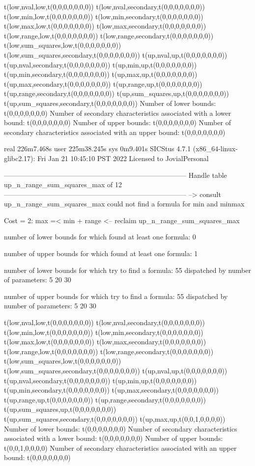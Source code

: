 t(low,nval,low,t(0,0,0,0,0,0,0))
t(low,nval,secondary,t(0,0,0,0,0,0,0))
t(low,min,low,t(0,0,0,0,0,0,0))
t(low,min,secondary,t(0,0,0,0,0,0,0))
t(low,max,low,t(0,0,0,0,0,0,0))
t(low,max,secondary,t(0,0,0,0,0,0,0))
t(low,range,low,t(0,0,0,0,0,0,0))
t(low,range,secondary,t(0,0,0,0,0,0,0))
t(low,sum_squares,low,t(0,0,0,0,0,0,0))
t(low,sum_squares,secondary,t(0,0,0,0,0,0,0))
t(up,nval,up,t(0,0,0,0,0,0,0))
t(up,nval,secondary,t(0,0,0,0,0,0,0))
t(up,min,up,t(0,0,0,0,0,0,0))
t(up,min,secondary,t(0,0,0,0,0,0,0))
t(up,max,up,t(0,0,0,0,0,0,0))
t(up,max,secondary,t(0,0,0,0,0,0,0))
t(up,range,up,t(0,0,0,0,0,0,0))
t(up,range,secondary,t(0,0,0,0,0,0,0))
t(up,sum_squares,up,t(0,0,0,0,0,0,0))
t(up,sum_squares,secondary,t(0,0,0,0,0,0,0))
Number of lower bounds:                                             t(0,0,0,0,0,0,0)
Number of secondary characteristics associated with a lower bound:  t(0,0,0,0,0,0,0)
Number of upper bounds:                                             t(0,0,0,0,0,0,0)
Number of secondary characteristics associated with an upper bound: t(0,0,0,0,0,0,0)

real	226m7.468s
user	225m38.245s
sys	0m9.401s
SICStus 4.7.1 (x86_64-linux-glibc2.17): Fri Jan 21 10:45:10 PST 2022
Licensed to JovialPersonal


--------------------------------------------------------------------------------
Handle table up_n_range_sum_squares_max of 12
--------------------------------------------------------------------------------
--> consult up_n_range_sum_squares_max
could not find a formula for min and minmax

Cost =  2:  max =< min + range
<-- reclaim up_n_range_sum_squares_max

number of lower bounds for which found at least one formula: 0

number of upper bounds for which found at least one formula: 1

number of lower bounds for which try to find a formula: 55
dispatched by number of parameters: 5  20  30

number of upper bounds for which try to find a formula: 55
dispatched by number of parameters: 5  20  30

t(low,nval,low,t(0,0,0,0,0,0,0))
t(low,nval,secondary,t(0,0,0,0,0,0,0))
t(low,min,low,t(0,0,0,0,0,0,0))
t(low,min,secondary,t(0,0,0,0,0,0,0))
t(low,max,low,t(0,0,0,0,0,0,0))
t(low,max,secondary,t(0,0,0,0,0,0,0))
t(low,range,low,t(0,0,0,0,0,0,0))
t(low,range,secondary,t(0,0,0,0,0,0,0))
t(low,sum_squares,low,t(0,0,0,0,0,0,0))
t(low,sum_squares,secondary,t(0,0,0,0,0,0,0))
t(up,nval,up,t(0,0,0,0,0,0,0))
t(up,nval,secondary,t(0,0,0,0,0,0,0))
t(up,min,up,t(0,0,0,0,0,0,0))
t(up,min,secondary,t(0,0,0,0,0,0,0))
t(up,max,secondary,t(0,0,0,0,0,0,0))
t(up,range,up,t(0,0,0,0,0,0,0))
t(up,range,secondary,t(0,0,0,0,0,0,0))
t(up,sum_squares,up,t(0,0,0,0,0,0,0))
t(up,sum_squares,secondary,t(0,0,0,0,0,0,0))
t(up,max,up,t(0,0,1,0,0,0,0))
Number of lower bounds:                                             t(0,0,0,0,0,0,0)
Number of secondary characteristics associated with a lower bound:  t(0,0,0,0,0,0,0)
Number of upper bounds:                                             t(0,0,1,0,0,0,0)
Number of secondary characteristics associated with an upper bound: t(0,0,0,0,0,0,0)

